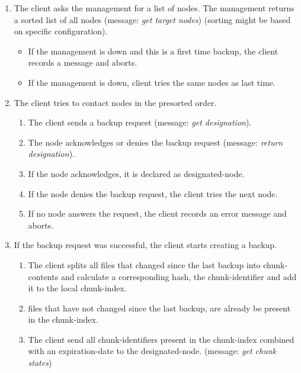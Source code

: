 \begin{enumerate}
    \item The \gls{client} asks the \gls{management} for a list of \glspl{node}. The \gls{management} returns a sorted list of all \glspl{node} (message: \emph{get target nodes}) (sorting might be based on specific configuration).
        \begin{itemize}
            \item If the \gls{management} is down and this is a first time backup, the \gls{client} records a message and aborts.
            \item If the \gls{management} is down, \gls{client} tries the same \glspl{node} as last time.
        \end{itemize}
    \item The \gls{client} tries to contact \glspl{node} in the presorted order.
        \begin{enumerate}
            \item The \gls{client} sends a backup request (message: \emph{get designation}).
            \item The \gls{node} acknowledges or denies the backup request (message: \emph{return designation}).
            \item If the \gls{node} acknowledges, it is declared as \gls{designated-node}.
            \item If the \gls{node} denies the backup request, the \gls{client} tries the next \gls{node}.
            \item If no \gls{node} answers the request, the \gls{client} records an error message and aborts.
       \end{enumerate}
   \item If the backup request was successful, the \gls{client} starts creating a backup.
        \begin{enumerate}
            \item The \gls{client} splits all \glspl{file} that changed since the last backup into \glspl{chunk-content} and calculate a corresponding hash, the \gls{chunk-identifier} and add it to the local \gls{chunk-index}.
            \item \Glspl{file} that have not changed since the last backup, are already be present in the \gls{chunk-index}.
            \item The \gls{client} send all \glspl{chunk-identifier} present in the \gls{chunk-index} combined with an \gls{expiration-date} to the \gls{designated-node}. (message: \emph{get chunk states})

\end{enumerate}
\end{enumerate}
